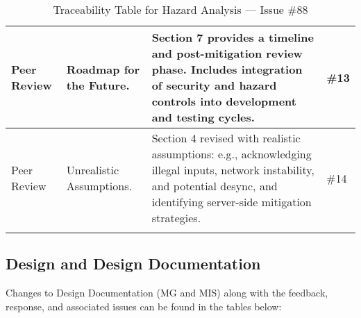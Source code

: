 \documentclass{article}
\begin{document}
\begin{longtable}{|p{2cm}|p{5cm}|p{5cm}|p{2cm}|}
\hline
Peer Review & Roadmap for the Future. & Section 7 provides a timeline and post-mitigation review phase. Includes integration of security and hazard controls into development and testing cycles. & \#13 \\
\hline
Peer Review & Unrealistic Assumptions. & Section 4 revised with realistic assumptions: e.g., acknowledging illegal inputs, network instability, and potential desync, and identifying server-side mitigation strategies. & \#14 \\
\hline
\caption{Traceability Table for Hazard Analysis — Issue \#88}
\end{longtable}



\subsection{Design and Design Documentation}
Changes to Design Documentation (MG and MIS) along with the feedback, response, and associated issues can be found in the tables below: 
\end{document}
